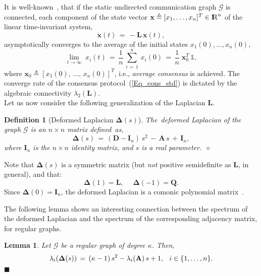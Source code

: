 \documentclass[letterpaper,9pt,twocolumn]{autart}
\newcommand{\rr}{\mathop{{\rm I}\mskip-4.0mu{\rm R}}\nolimits}
\newcommand{\vet}[1]{\ensuremath{{\mathbf #1}}}
\newtheorem{definition}{\textbf{Definition}}
\newtheorem{lemma}{\textbf{Lemma}}
\begin{document}
It is well-known~\cite{OlfatiSaberMu_TAC04}, that if the static undirected communication graph $\mathcal{G}$
is connected, each component of the state vector $\vet{x} \triangleq [x_1,\ldots,x_n]^T \in \rr^n$
of the linear time-invariant system,
\begin{equation}\label{Eq_cons_std}
\dot{\vet{x}}(t) \,=\, - \vet{L}\,\vet{x}(t),
\end{equation}
asymptotically converges to the average of the initial states $x_1(0),\ldots,x_n(0)$,
$$
\lim_{t \rightarrow \infty}\; x_i(t) \,=\, \frac{1}{n}\,\sum_{i\,=\,1}^n\,x_i(0) \,=\, \frac{1}{n}\;\vet{x}_0^T\,\mathds{1},
$$
where $\vet{x}_0 \triangleq [x_1(0),\,\ldots,\,x_n(0)]^T$, i.e., \emph{average consensus} is achieved.
The converge rate of the consensus protocol~(\ref{Eq_cons_std}) is dictated by the algebraic
connectivity $\lambda_2(\vet{L})$.\\
Let us now consider the following generalization of the Laplacian $\vet{L}$.
\begin{definition}[Deformed Laplacian $\boldsymbol{\Delta}(s)$]
The~\emph{deformed Laplacian} of the graph $\mathcal{G}$ is an $n
\times n$ matrix \mbox{defined as},
\begin{equation*}\label{Eq:pol_mat}
\boldsymbol{\Delta}(s) \,=\, (\vet{D} - \vet{I}_{n})\,s^2 \,-\, \vet{A}\,s \,+\, \vet{I}_{n},
\end{equation*}
where $\vet{I}_{n}$ is the $n \times n$ identity matrix, and $s$ is a real parameter.~\hfill$\diamond$
\end{definition} Note that $\boldsymbol{\Delta}(s)$ is a symmetric matrix (but \emph{not} positive
semidefinite as $\vet{L}$, in general), and that:
$$
\boldsymbol{\Delta}(1) = \vet{L},\quad\; \boldsymbol{\Delta}(-1) = \vet{Q}.
$$
Since $\boldsymbol{\Delta}(0) = \vet{I}_n$, the deformed
Laplacian is a comonic polynomial matrix~\cite[Sect.~7.2]{GohbergLaRo_Book09}. 

The following lemma shows an interesting connection between the spectrum of
the deformed Laplacian and the spectrum of the corresponding
adjacency matrix, for regular graphs.

\begin{lemma}\label{Lemma1}
Let $\mathcal{G}$ be a regular graph of degree $\kappa$. Then,
$$
\lambda_i(\boldsymbol{\Delta}(s)) \,=\, (\kappa - 1)\,s^2 -
\lambda_i(\vet{A})\,s + 1,\;\;\, i \in \{1,\ldots,n\}.\vspace{-0.2cm}
$$
\hfill$\blacksquare$
\end{lemma}
\vspace{-0.15cm}
\end{document}
